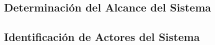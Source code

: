 \subsection{Determinación del Alcance del Sistema}



\subsection{Identificación de Actores del Sistema} 